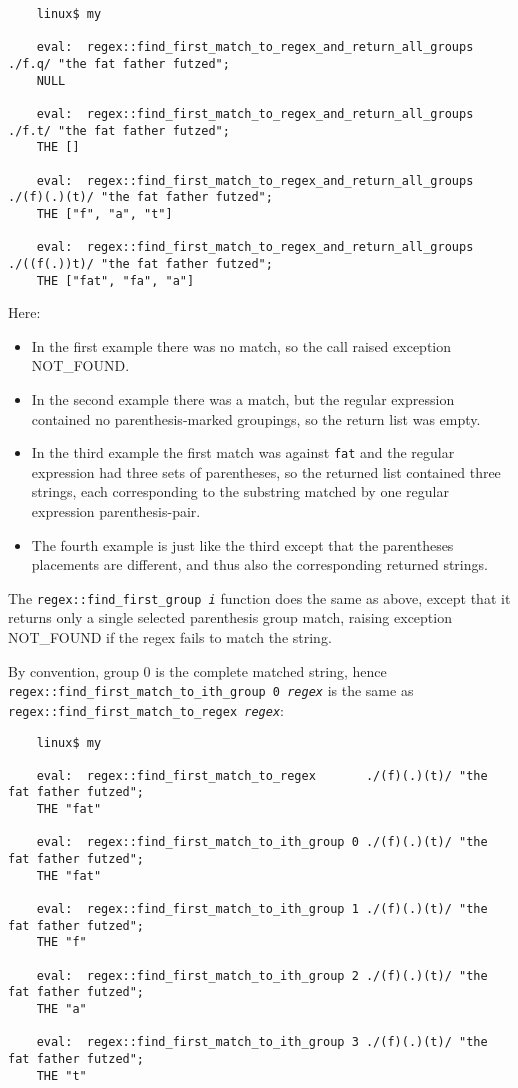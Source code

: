 \begin{verbatim}
    linux$ my

    eval:  regex::find_first_match_to_regex_and_return_all_groups ./f.q/ "the fat father futzed";
    NULL

    eval:  regex::find_first_match_to_regex_and_return_all_groups ./f.t/ "the fat father futzed";
    THE []

    eval:  regex::find_first_match_to_regex_and_return_all_groups ./(f)(.)(t)/ "the fat father futzed";
    THE ["f", "a", "t"]

    eval:  regex::find_first_match_to_regex_and_return_all_groups ./((f(.))t)/ "the fat father futzed";
    THE ["fat", "fa", "a"]
\end{verbatim}

Here:
\begin{itemize}
\item In the first example there was no match, so the call raised exception {\sc NOT\_FOUND}.

\item In the second example there was a match, but the regular expression contained 
no parenthesis-marked groupings, so the return list was empty.

\item In the third example the first match was against {\tt fat} and the regular 
expression had three sets of parentheses, so the returned list contained 
three strings, each corresponding to the substring matched by one 
regular expression parenthesis-pair.

\item The fourth example is just like the third except that the parentheses placements 
are different, and thus also the corresponding returned strings.
\end{itemize}

The {\tt regex::find\_first\_group {\it i}} function does the same as above, except that 
it returns only a single selected parenthesis group match, raising exception {\sc NOT\_FOUND} 
if the regex fails to match the string. 

By convention, group 0 is the complete matched string, hence {\tt regex::find\_first\_match\_to\_ith\_group 0 {\it regex}} 
is the same as {\tt regex::find\_first\_match\_to\_regex {\it regex}}:

\begin{verbatim}
    linux$ my

    eval:  regex::find_first_match_to_regex       ./(f)(.)(t)/ "the fat father futzed";
    THE "fat"

    eval:  regex::find_first_match_to_ith_group 0 ./(f)(.)(t)/ "the fat father futzed";
    THE "fat"

    eval:  regex::find_first_match_to_ith_group 1 ./(f)(.)(t)/ "the fat father futzed";
    THE "f"

    eval:  regex::find_first_match_to_ith_group 2 ./(f)(.)(t)/ "the fat father futzed";
    THE "a"

    eval:  regex::find_first_match_to_ith_group 3 ./(f)(.)(t)/ "the fat father futzed";
    THE "t"
\end{verbatim}


